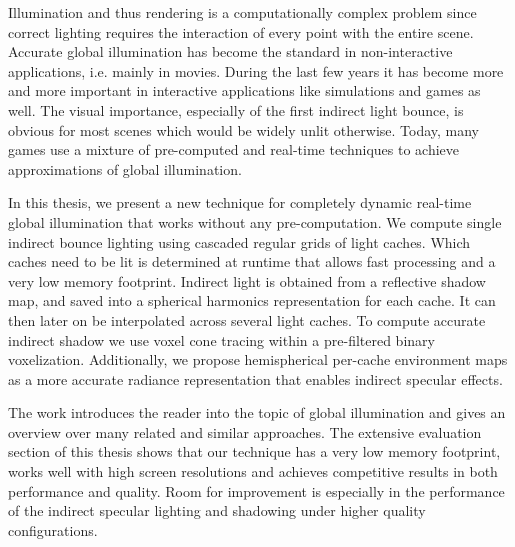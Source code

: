 \documentclass[thesis.tex]{subfiles}
\begin{document}

Illumination and thus rendering is a computationally complex problem since correct lighting requires the interaction of every point with the entire scene.
Accurate global illumination has become the standard in non-interactive applications, i.e. mainly in movies.
During the last few years it has become more and more important in interactive applications like simulations and games as well.
The visual importance, especially of the first indirect light bounce, is obvious for most scenes which would be widely unlit otherwise.
Today, many games use a mixture of pre-computed and real-time techniques to achieve approximations of global illumination.

In this thesis, we present a new technique for completely dynamic real-time global illumination that works without any pre-computation.
We compute single indirect bounce lighting using cascaded regular grids of light caches.
Which caches need to be lit is determined at runtime that allows fast processing and a very low memory footprint.
Indirect light is obtained from a reflective shadow map, and saved into a spherical harmonics representation for each cache.
It can then later on be interpolated across several light caches.
To compute accurate indirect shadow we use voxel cone tracing within a pre-filtered binary voxelization.
Additionally, we propose hemispherical per-cache environment maps as a more accurate radiance representation that enables indirect specular effects.

The work introduces the reader into the topic of global illumination and gives an overview over many related and similar approaches.
The extensive evaluation section of this thesis shows that our technique has a very low memory footprint, works well with high screen resolutions and achieves competitive results in both performance and quality.
Room for improvement is especially in the performance of the indirect specular lighting and shadowing under higher quality configurations.
\end{document}
